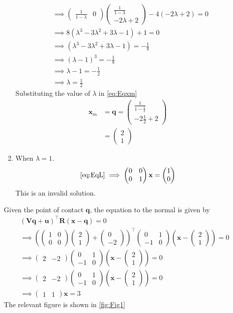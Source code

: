 \documentclass[12pt]{article}
\providecommand{\brak}[1]{\ensuremath{\left(#1\right)}}
\newcommand{\myvec}[1]{\ensuremath{\begin{pmatrix}#1\end{pmatrix}}}
\let\vec\mathbf
\begin{document}
\begin{enumerate}
\begin{enumerate}
\begin{align}
	&\implies \myvec{\frac{1}{1-\lambda} & 0}\myvec{\frac{1}{1-\lambda} \\ -2\lambda+2} - 4\brak{-2\lambda+2} = 0 \\
	&\implies 8\brak{\lambda^3 -3\lambda^2+3\lambda-1} +1 = 0 \\ 
	&\implies \brak{\lambda^3 -3\lambda^2+3\lambda-1}  = -\frac{1}{8} \\ 
	& \implies \brak{\lambda-1}^3 = -\frac{1}{8} \\ 
	& \implies \lambda-1 = -\frac{1}{2} \\
	& \implies \lambda = \frac{1}{2}
\end{align}
Substituting the value of $\lambda$ in    \eqref{eq:Eqxm}
\begin{align}
	\vec{x}_{m} &= \vec{q} = \myvec{ \frac{1}{1-\frac{1}{2}} \\ -2\frac{1}{2}+2} \\
	&= \myvec{2 \\ 1}
\end{align}
\item When $\lambda = 1$. 
\begin{align}
	\eqref{eq:EqL} \implies \myvec{0 & 0 \\ 0&1}\vec{x} = \myvec{1 \\ 0}
\end{align}
This is an invalid solution. 
\end{enumerate}
Given the point of contact $\vec{q}$, the equation to the normal is given by
\begin{align}
	&\brak{\vec{V}\vec{q}+\vec{u}}^\top\vec{R}\brak{\vec{x}-\vec{q}} = 0 \\
	&\implies \brak{\myvec{1&0\\0&0}\myvec{2\\1}+\myvec{0 \\ -2}}^\top \myvec{0&1 \\-1&0}\brak{\vec{x}-\myvec{2\\1}} =0\\
	&\implies \myvec{2&-2} \myvec{0&1 \\-1&0}\brak{\vec{x}-\myvec{2\\1}} = 0 \\
	&\implies \myvec{2&-2} \myvec{0&1 \\-1&0}\brak{\vec{x}-\myvec{2\\1}} = 0 \\
	&\implies \myvec{1&1}\vec{x} = 3 
\end{align}
The relevant figure is shown in \ref{fig:Fig1}
\begin{figure}[!h]

\end{figure}
\end{enumerate}
\end{document}
